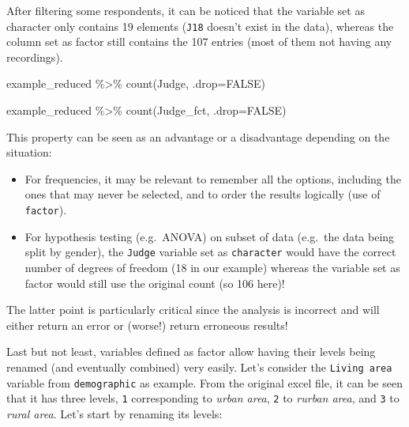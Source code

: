 \documentclass[
]{book}
\newenvironment{Shaded}{\begin{snugshade}}{\end{snugshade}}
\newcommand{\AttributeTok}[1]{\textcolor[rgb]{0.77,0.63,0.00}{#1}}
\newcommand{\ConstantTok}[1]{\textcolor[rgb]{0.00,0.00,0.00}{#1}}
\newcommand{\FunctionTok}[1]{\textcolor[rgb]{0.00,0.00,0.00}{#1}}
\newcommand{\NormalTok}[1]{#1}
\newcommand{\SpecialCharTok}[1]{\textcolor[rgb]{0.00,0.00,0.00}{#1}}
\providecommand{\tightlist}{%
  \setlength{\itemsep}{0pt}\setlength{\parskip}{0pt}}
\begin{document}
After filtering some respondents, it can be noticed that the variable set as character only contains 19 elements (\texttt{J18} doesn't exist in the data), whereas the column set as factor still contains the 107 entries (most of them not having any recordings).

\begin{Shaded}
\begin{Highlighting}[]
\NormalTok{example\_reduced }\SpecialCharTok{\%\textgreater{}\%} 
  \FunctionTok{count}\NormalTok{(Judge, }\AttributeTok{.drop=}\ConstantTok{FALSE}\NormalTok{)}

\NormalTok{example\_reduced }\SpecialCharTok{\%\textgreater{}\%} 
  \FunctionTok{count}\NormalTok{(Judge\_fct, }\AttributeTok{.drop=}\ConstantTok{FALSE}\NormalTok{)}
\end{Highlighting}
\end{Shaded}

This property can be seen as an advantage or a disadvantage depending on the situation:

\begin{itemize}
\tightlist
\item
  For frequencies, it may be relevant to remember all the options, including the ones that may never be selected, and to order the results logically (use of \texttt{factor}).
\item
  For hypothesis testing (e.g.~ANOVA) on subset of data (e.g.~the data being split by gender), the \texttt{Judge} variable set as \texttt{character} would have the correct number of degrees of freedom (18 in our example) whereas the variable set as factor would still use the original count (so 106 here)!
\end{itemize}

The latter point is particularly critical since the analysis is incorrect and will either return an error or (worse!) return erroneous results!

Last but not least, variables defined as factor allow having their levels being renamed (and eventually combined) very easily.
Let's consider the \texttt{Living\ area} variable from \texttt{demographic} as example. From the original excel file, it can be seen that it has three levels, \texttt{1} corresponding to \emph{urban area}, \texttt{2} to \emph{rurban area}, and \texttt{3} to \emph{rural area}. Let's start by renaming its levels:
\end{document}
